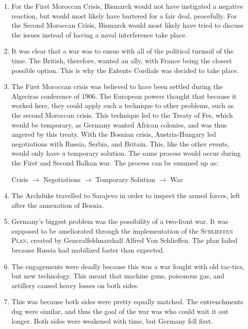 \documentclass[12pt]{article}
\begin{document}
\begin{enumerate}
\item For the First Moroccan Crisis, Bismarck would not have instigated a negative reaction, but would most likely have bartered for a fair deal, peacefully. For the Second Moroccan Crisis, Bismarck would most likely have tried to discuss the issues instead of having a naval interference take place.

\item It was clear that a war was to ensue with all of the political turmoil of the time. The British, therefore, wanted an ally, with France being the closest possible option. This is why the Entente Cordiale was decided to take place.

\item The First Moroccan crisis was believed to have been settled during the Algeciras conference of 1906. The European powers thought that because it worked here, they could apply such a technique to other problems, such as the second Moroccan crisis. This technique led to the Treaty of Fes, which would be temporary, as Germany wanted African colonies, and was thus angered by this treaty. With the Bosnian crisis, Austria-Hungary led negotiations with Russia, Serbia, and Britain. This, like the other events, would only have a temporary solution. The same process would occur during the First and Second Balkan war. The process can be summed up as:
\vspace{-10pt}
\begin{center}
Crisis $\longrightarrow$ Negotiations $\longrightarrow$ Temporary Solution $\longrightarrow$ War 
\end{center}

\item The Archduke travelled to Sarajevo in order to inspect the armed forces, left after the annexation of Bosnia.

\item Germany's biggest problem was the possibility of a two-front war. It was supposed to be ameliorated through the implementation of the \textsc{Schlieffen Plan}, created by Generalfeldmarshall Alfred Von Schlieffen. The plan failed because Russia had mobilized faster than expected.

\item The engagements were deadly because this was a war fought with old tac-tics, but new technology. This meant that machine guns, poisonous gas, and artillery caused heavy losses on both sides.

\item This was because both sides were pretty equally matched. The entrenchments dug were similar, and thus the goal of the war was who could wait it out longer. Both sides were weakened with time, but Germany fell first.


\end{enumerate}
\end{document}

